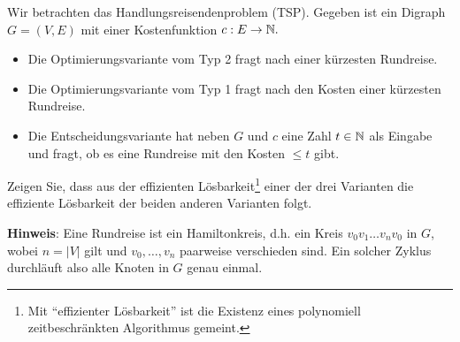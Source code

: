 \begin{exercise}

Wir betrachten das Handlungsreisendenproblem (TSP).
Gegeben ist ein Digraph $G = (V,E)$ mit einer Kostenfunktion $c : E \to \mathbb{N}.$

\begin{itemize}
  \item Die Optimierungsvariante vom Typ 2 fragt  nach einer k\"urzesten Rundreise. 
  \item Die Optimierungsvariante vom Typ 1 fragt  nach den Kosten einer k\"urzesten
Rundreise.
  \item Die Entscheidungsvariante hat neben $G$ und $c$ eine Zahl $t \in \mathbb{N}$ als Eingabe und fragt, ob es eine Rundreise mit den Kosten $\le t$ gibt.
\end{itemize}
Zeigen Sie, dass aus der effizienten L\"osbarkeit\footnote{Mit ``effizienter L\"osbarkeit'' ist die Existenz eines
polynomiell zeitbeschr\"ankten Algorithmus gemeint.
} einer der drei Varianten  
die effiziente L\"osbarkeit der beiden anderen Varianten folgt.

{\bfseries Hinweis}:
Eine Rundreise ist ein Hamiltonkreis, d.h. ein Kreis $v_0v_1\ldots v_n v_0$ in $G$, wobei $n = |V|$ gilt und $v_0, \ldots, v_n$ paarweise verschieden sind. Ein solcher Zyklus durchl\"auft also alle Knoten in $G$ genau einmal.
\end{exercise}

